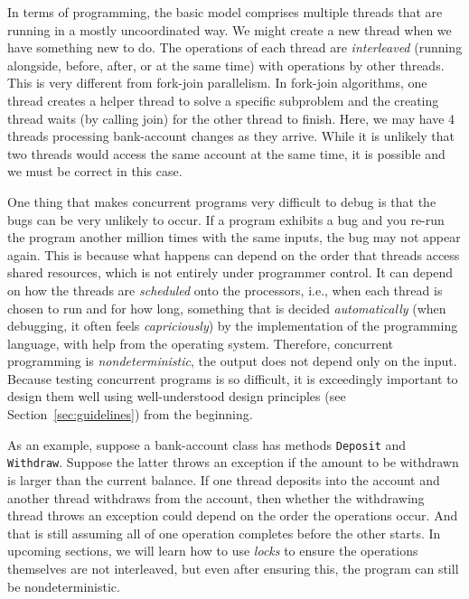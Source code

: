 \documentclass[10pt]{article}
\begin{document}
In terms of programming, the basic model comprises multiple
threads that are running in a mostly uncoordinated way.  We might
create a new thread when we have something new to do.  The operations
of each thread are \emph{interleaved} (running alongside, before,
after, or at the same time) with operations by other threads.  This is
very different from fork-join parallelism.  In fork-join algorithms,
one thread creates a helper thread to solve a specific subproblem and
the creating thread waits (by calling join) for the other thread to
finish.  Here, we may have 4 threads processing bank-account changes
as they arrive.  While it is unlikely that two threads would access
the same account at the same time, it is possible and we must be
correct in this case.

One thing that makes concurrent programs very difficult to debug is
that the bugs can be very unlikely to occur.  If a program exhibits a
bug and you re-run the program another million times with the same
inputs, the bug may not appear again.  This is because what happens
can depend on the order that threads access shared resources, which is
not entirely under programmer control.  It can depend on how the
threads are \emph{scheduled} onto the processors, i.e., when each
thread is chosen to run and for how long, something that is decided
\emph{automatically} (when debugging, it often feels
\emph{capriciously}) by the implementation of the programming
language, with help from the operating system.  Therefore, concurrent
programming is \emph{nondeterministic}, the output does not depend
only on the input.  Because testing concurrent programs is so
difficult, it is exceedingly important to design them well using
well-understood design principles (see Section~\ref{sec:guidelines}) from the
beginning.

As an example, suppose a bank-account class has methods {\tt Deposit}
and {\tt Withdraw}.  Suppose the latter throws an exception if the
amount to be withdrawn is larger than the current balance.  If one
thread deposits into the account and another thread withdraws from the
account, then whether the withdrawing thread throws an exception
could depend on the order the operations occur.  And that is still
assuming all of one operation completes before the other starts.  In upcoming
sections, we will learn how to use \emph{locks} to ensure the
operations themselves are not interleaved, but even after ensuring
this, the program can still be nondeterministic.
\end{document}
